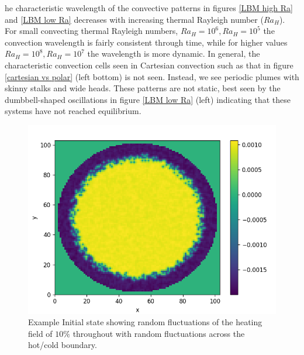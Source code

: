 \documentclass{article}
\begin{document}
\noindent he characteristic wavelength of the convective patterns in figures \ref{LBM high Ra} and \ref{LBM low Ra} decreases with increasing thermal Rayleigh number ($Ra_H$). For small convecting thermal Rayleigh numbers, $Ra_H=10^6, Ra_H=10^5$ the convection wavelength is fairly consistent through time, while for higher values $Ra_H=10^8,Ra_H=10^7$ the wavelength is more dynamic. In general, the characteristic convection cells seen in Cartesian convection such as that in figure \ref{cartesian vs polar} (left bottom) is not seen. Instead, we see periodic plumes with skinny stalks and wide heads. These patterns are not static, best seen by the dumbbell-shaped oscillations in figure \ref{LBM low Ra} (left) indicating that these systems have not reached equilibrium. 

\begin{figure}[H]
	\centering
	\includegraphics[scale=1.5]{initialState.png}
	\caption{Example Initial state showing random fluctuations of the heating field of $10 \%$ throughout with random fluctuations across the hot/cold boundary. }
	\label{LBM initial state}
\end{figure}
\end{document}
